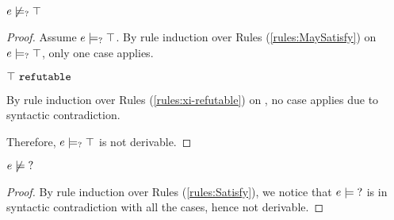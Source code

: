 \begin{lemma}
  \label{lem:no-e-may-satisfy-truth}
  $e \not\models_{?} \top$
\end{lemma}
\begin{proof}
  Assume $e \models_{?} \top$.
  By rule induction over Rules (\ref{rules:MaySatisfy}) on $e \models_{?} \top$, only one case applies.
  \begin{byCases}
  \item[\text{(\ref{rule:CMSNotVal})}]
    \begin{pfsteps*}
    \item $\top ~\mathtt{refutable}$  
    \end{pfsteps*}
    By rule induction over Rules (\ref{rules:xi-refutable}) on , no case applies due to syntactic contradiction.
  \end{byCases}
  Therefore, $e \models_{?} \top$ is not derivable.
  \resetpfcounter
\end{proof}

\begin{lemma}
  \label{lem:no-e-satisfy-unknown}
  $e \not\models \mathtt{?}$
\end{lemma}
\begin{proof}
  By rule induction over Rules (\ref{rules:Satisfy}), we notice that $e \models \mathtt{?}$ is in syntactic contradiction with all the cases, hence not derivable.
\end{proof}

